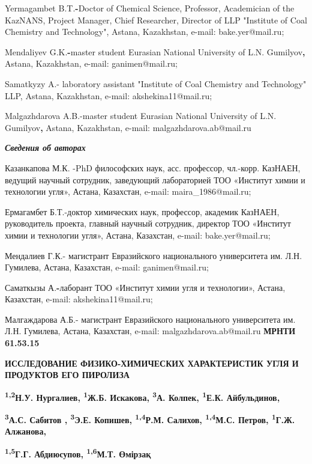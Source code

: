 Yermagambet B.T.{\bfseries -}Doctor of Chemical Science, Professor,
Academician of the KazNANS, Project Manager, Chief Researcher, Director
of LLP "Institute of Coal Chemistry and Technology", Astana, Kazakhstan,
e-mail: bake.yer@mail.ru;

Mendaliyev G.K.{\bfseries -}master student Eurasian National University of
L.N. Gumilyov{\bfseries ,} Astana, Kazakhstan, e-mail: ganimen@mail.ru;

Samatkyzy A.- laboratory assistant "Institute of Coal Chemistry and
Technology" LLP, Astana, Kazakhstan, e-mail: akshekina11@mail.ru;

Malgazhdarova A.B.-master student Eurasian National University of L.N.
Gumilyov{\bfseries ,} Astana, Kazakhstan, e-mail: malgazhdarova.ab@mail.ru

\emph{{\bfseries Сведения об авторах}}

Казанкапова М.К. -PhD философских наук, асс. профессор, чл.-корр.
КазНАЕН, ведущий научный сотрудник, заведующий лабораторией ТОО
«Институт химии и технологии угля», Астана, Казахстан, e-mail:
maira\_1986@mail.ru;

Ермагамбет Б.Т.-доктор химических наук, профессор, академик КазНАЕН,
руководитель проекта, главный научный сотрудник, директор ТОО «Институт
химии и технологии угля», Астана, Казахстан, e-mail: bake.yer@mail.ru;

Мендалиев Г.К.- магистрант Евразийского национального университета им.
Л.Н. Гумилева, Астана, Казахстан, e-mail: ganimen@mail.ru;

Саматкызы А.{\bfseries -}лаборант ТОО «Институт химии угля и технологии»,
Астана, Казахстан, e-mail: akshekina11@mail.ru;

Малгаждарова А.Б.- магистрант Евразийского национального университета
им. Л.Н. Гумилева, Астана, Казахстан, e-mail: malgazhdarova.ab@mail.ru\newpage
{\bfseries МРНТИ 61.53.15}

{\bfseries ИССЛЕДОВАНИЕ ФИЗИКО-ХИМИЧЕСКИХ ХАРАКТЕРИСТИК УГЛЯ И ПРОДУКТОВ
ЕГО ПИРОЛИЗА}

{\bfseries \textsuperscript{1,2}Н.У. Нургалиев, \textsuperscript{1}Ж.Б.
Искакова, \textsuperscript{3}А. Колпек, \textsuperscript{1}Е.К.
Айбульдинов,}

{\bfseries \textsuperscript{3}А.С. Сабитов , \textsuperscript{3}Э.Е.
Копишев, \textsuperscript{1,4}Р.М. Салихов, \textsuperscript{1,4}М.С.
Петров, \textsuperscript{1}Г.Ж. Алжанова,}

{\bfseries \textsuperscript{1,5}Г.Г. Абдиюсупов, \textsuperscript{1,6}М.Т.
Өмірзақ}

